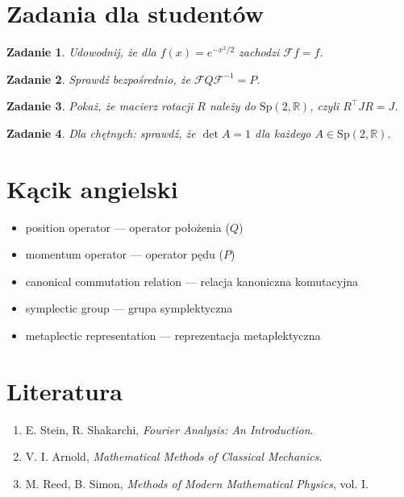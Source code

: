 \documentclass[12pt]{article}
\newtheorem{exer}{Zadanie}
\newcommand{\Sp}{\mathrm{Sp}}
\begin{document}
\section{Zadania dla studentów}
\begin{exer}
Udowodnij, że dla $f(x)=e^{-x^2/2}$ zachodzi $\mathcal{F}f=f$. 
\end{exer}

\begin{exer}
Sprawdź bezpośrednio, że $\mathcal{F}Q\mathcal{F}^{-1}=P$. 
\end{exer}

\begin{exer}
Pokaż, że macierz rotacji $R$ należy do $\Sp(2,\mathbb{R})$, czyli $R^\top J R=J$. 
\end{exer}

\begin{exer}
Dla chętnych: sprawdź, że $\det A=1$ dla każdego $A\in \Sp(2,\mathbb{R})$. 
\end{exer}

\section*{Kącik angielski}
\begin{itemize}[label=$\triangleright$]
\item position operator — operator położenia ($Q$)
\item momentum operator — operator pędu ($P$)
\item canonical commutation relation — relacja kanoniczna komutacyjna
\item symplectic group — grupa symplektyczna
\item metaplectic representation — reprezentacja metaplektyczna
\end{itemize}

\section*{Literatura}
\begin{enumerate}
\item E. Stein, R. Shakarchi, \emph{Fourier Analysis: An Introduction}.
\item V. I. Arnold, \emph{Mathematical Methods of Classical Mechanics}.
\item M. Reed, B. Simon, \emph{Methods of Modern Mathematical Physics}, vol. I.
\end{enumerate}
\end{document}
